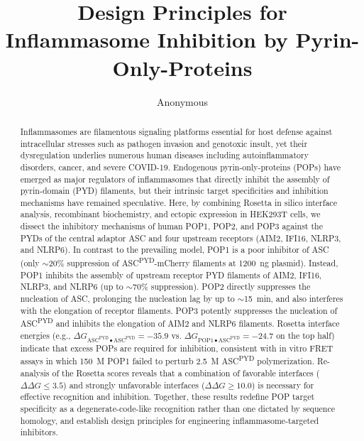 \documentclass[11pt]{article}
\title{Design Principles for Inflammasome Inhibition by Pyrin-Only-Proteins}
\author{Anonymous}
\date{}
\begin{document}
\maketitle

\begin{abstract}
Inflammasomes are filamentous signaling platforms essential for host defense against intracellular stresses such as pathogen invasion and genotoxic insult, yet their dysregulation underlies numerous human diseases including autoinflammatory disorders, cancer, and severe COVID-19. Endogenous pyrin-only-proteins (POPs) have emerged as major regulators of inflammasomes that directly inhibit the assembly of pyrin-domain (PYD) filaments, but their intrinsic target specificities and inhibition mechanisms have remained speculative. Here, by combining Rosetta in silico interface analysis, recombinant biochemistry, and ectopic expression in HEK293T cells, we dissect the inhibitory mechanisms of human POP1, POP2, and POP3 against the PYDs of the central adaptor ASC and four upstream receptors (AIM2, IFI16, NLRP3, and NLRP6). In contrast to the prevailing model, POP1 is a poor inhibitor of ASC (only $\sim$20\% suppression of ASC\textsuperscript{PYD}-mCherry filaments at 1200~ng plasmid). Instead, POP1 inhibits the assembly of upstream receptor PYD filaments of AIM2, IFI16, NLRP3, and NLRP6 (up to $\sim$70\% suppression). POP2 directly suppresses the nucleation of ASC, prolonging the nucleation lag by up to $\sim$15~min, and also interferes with the elongation of receptor filaments. POP3 potently suppresses the nucleation of ASC\textsuperscript{PYD} and inhibits the elongation of AIM2 and NLRP6 filaments. Rosetta interface energies (e.g., $\Delta G_{\mathrm{ASC}^{\mathrm{PYD}}\bullet\mathrm{ASC}^{\mathrm{PYD}}}=-35.9$ vs. $\Delta G_{\mathrm{POP1}\bullet\mathrm{ASC}^{\mathrm{PYD}}}=-24.7$ on the top half) indicate that excess POPs are required for inhibition, consistent with in vitro FRET assays in which 150~\textmu M POP1 failed to perturb 2.5~\textmu M ASC\textsuperscript{PYD} polymerization. Re-analysis of the Rosetta scores reveals that a combination of favorable interfaces ($\Delta\Delta G\leq 3.5$) and strongly unfavorable interfaces ($\Delta\Delta G\geq 10.0$) is necessary for effective recognition and inhibition. Together, these results redefine POP target specificity as a degenerate-code-like recognition rather than one dictated by sequence homology, and establish design principles for engineering inflammasome-targeted inhibitors.
\end{abstract}
\end{document}
